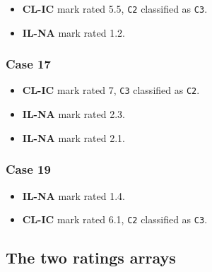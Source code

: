\documentclass[
]{book}
\newenvironment{Shaded}{\begin{snugshade}}{\end{snugshade}}
\newcommand{\AttributeTok}[1]{\textcolor[rgb]{0.77,0.63,0.00}{#1}}
\newcommand{\CommentTok}[1]{\textcolor[rgb]{0.56,0.35,0.01}{\textit{#1}}}
\newcommand{\DecValTok}[1]{\textcolor[rgb]{0.00,0.00,0.81}{#1}}
\newcommand{\FunctionTok}[1]{\textcolor[rgb]{0.00,0.00,0.00}{#1}}
\newcommand{\NormalTok}[1]{#1}
\newcommand{\OtherTok}[1]{\textcolor[rgb]{0.56,0.35,0.01}{#1}}
\newcommand{\SpecialCharTok}[1]{\textcolor[rgb]{0.00,0.00,0.00}{#1}}
\newcommand{\StringTok}[1]{\textcolor[rgb]{0.31,0.60,0.02}{#1}}
\providecommand{\tightlist}{%
  \setlength{\itemsep}{0pt}\setlength{\parskip}{0pt}}
\begin{document}
\begin{itemize}
\tightlist
\item
  \textbf{CL-IC} mark rated 5.5, \texttt{C2} classified as \texttt{C3}.
\item
  \textbf{IL-NA} mark rated 1.2.
\end{itemize}

\hypertarget{classification-tasks-example1-fp-case17}{%
\subsubsection{Case 17}\label{classification-tasks-example1-fp-case17}}

\begin{itemize}
\tightlist
\item
  \textbf{CL-IC} mark rated 7, \texttt{C3} classified as \texttt{C2}.
\item
  \textbf{IL-NA} mark rated 2.3.
\item
  \textbf{IL-NA} mark rated 2.1.
\end{itemize}

\hypertarget{classification-tasks-example1-fp-case19}{%
\subsubsection{Case 19}\label{classification-tasks-example1-fp-case19}}

\begin{itemize}
\tightlist
\item
  \textbf{IL-NA} mark rated 1.4.
\item
  \textbf{CL-IC} mark rated 6.1, \texttt{C2} classified as \texttt{C3}.
\end{itemize}

\hypertarget{the-two-ratings-arrays}{%
\subsection{The two ratings arrays}\label{the-two-ratings-arrays}}

\begin{Shaded}
\end{Shaded}
\end{document}
